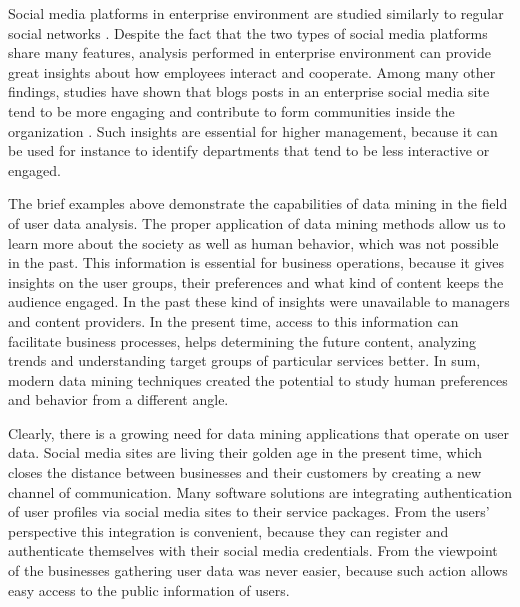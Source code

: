 Social media platforms in enterprise environment are studied similarly to regular social networks \cite{guy2016whatsyourorganizationlike}. Despite the fact that the two types of social media platforms share many features, analysis performed in enterprise environment can provide great insights about how employees interact and cooperate. Among many other findings, studies have shown that blogs posts in an enterprise social media site tend to be more engaging and contribute to form communities inside the organization \cite{guy2016whatsyourorganizationlike}. Such insights are essential for higher management, because it can be used for instance to identify departments that tend to be less interactive or engaged.  


The brief examples above demonstrate the capabilities of data mining in the field of user data analysis. The proper application of data mining methods allow us to learn more about the society as well as human behavior, which was not possible in the past. This information is essential for business operations, because it gives insights on the user groups, their preferences and what kind of content keeps the audience engaged. In the past these kind of insights were unavailable to managers and content providers. In the present time, access to this information can facilitate business processes, helps determining the future content, analyzing trends and understanding target groups of particular services better. In sum, modern data mining techniques created the potential to study human preferences and behavior from a different angle. 

Clearly, there is a growing need for data mining applications that operate on user data. Social media sites are living their golden age in the present time, which closes the distance between businesses and their customers by creating a new channel of communication. Many software solutions are integrating authentication of user profiles via social media sites to their service packages. From the users' perspective this integration is convenient, because they can register and authenticate themselves with their social media credentials. From the viewpoint of the businesses gathering user data was never easier, because such action allows easy access to the public information of users.